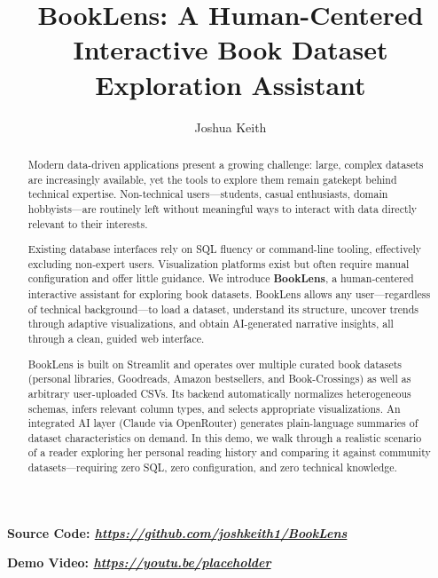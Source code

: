 \documentclass[sigconf]{acmart}
\begin{document}
\pagestyle{plain}
\title{BookLens: A Human-Centered Interactive Book Dataset Exploration Assistant}

\author{Joshua Keith}

\renewcommand{\shortauthors}{Keith}

\begin{abstract}
    Modern data-driven applications present a growing challenge: large, complex datasets are increasingly available, yet the tools to explore them remain gatekept behind technical expertise. Non-technical users---students, casual enthusiasts, domain hobbyists---are routinely left without meaningful ways to interact with data directly relevant to their interests.

    Existing database interfaces rely on SQL fluency or command-line tooling, effectively excluding non-expert users. Visualization platforms exist but often require manual configuration and offer little guidance. We introduce \textbf{BookLens}, a human-centered interactive assistant for exploring book datasets. BookLens allows any user---regardless of technical background---to load a dataset, understand its structure, uncover trends through adaptive visualizations, and obtain AI-generated narrative insights, all through a clean, guided web interface.

    BookLens is built on Streamlit and operates over multiple curated book datasets (personal libraries, Goodreads, Amazon bestsellers, and Book-Crossings) as well as arbitrary user-uploaded CSVs. Its backend automatically normalizes heterogeneous schemas, infers relevant column types, and selects appropriate visualizations. An integrated AI layer (Claude via OpenRouter) generates plain-language summaries of dataset characteristics on demand. In this demo, we walk through a realistic scenario of a reader exploring her personal reading history and comparing it against community datasets---requiring zero SQL, zero configuration, and zero technical knowledge.
\end{abstract}


\maketitle

\noindent \textbf{Source Code: \emph{\url{https://github.com/joshkeith1/BookLens}}}


\noindent \textbf{Demo Video: \emph{\url{https://youtu.be/placeholder}}}
\end{document}
